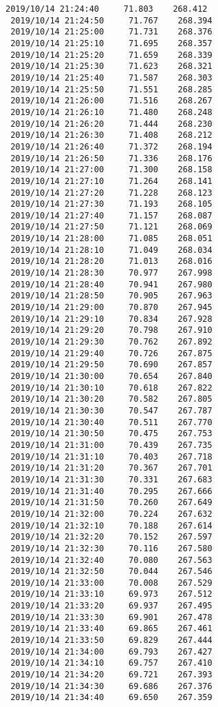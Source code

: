 \documentclass[11pt]{article}
\begin{document}
\begin{Verbatim}[commandchars=\\\{\}]
 2019/10/14 21:24:40     71.803    268.412
 2019/10/14 21:24:50     71.767    268.394
 2019/10/14 21:25:00     71.731    268.376
 2019/10/14 21:25:10     71.695    268.357
 2019/10/14 21:25:20     71.659    268.339
 2019/10/14 21:25:30     71.623    268.321
 2019/10/14 21:25:40     71.587    268.303
 2019/10/14 21:25:50     71.551    268.285
 2019/10/14 21:26:00     71.516    268.267
 2019/10/14 21:26:10     71.480    268.248
 2019/10/14 21:26:20     71.444    268.230
 2019/10/14 21:26:30     71.408    268.212
 2019/10/14 21:26:40     71.372    268.194
 2019/10/14 21:26:50     71.336    268.176
 2019/10/14 21:27:00     71.300    268.158
 2019/10/14 21:27:10     71.264    268.141
 2019/10/14 21:27:20     71.228    268.123
 2019/10/14 21:27:30     71.193    268.105
 2019/10/14 21:27:40     71.157    268.087
 2019/10/14 21:27:50     71.121    268.069
 2019/10/14 21:28:00     71.085    268.051
 2019/10/14 21:28:10     71.049    268.034
 2019/10/14 21:28:20     71.013    268.016
 2019/10/14 21:28:30     70.977    267.998
 2019/10/14 21:28:40     70.941    267.980
 2019/10/14 21:28:50     70.905    267.963
 2019/10/14 21:29:00     70.870    267.945
 2019/10/14 21:29:10     70.834    267.928
 2019/10/14 21:29:20     70.798    267.910
 2019/10/14 21:29:30     70.762    267.892
 2019/10/14 21:29:40     70.726    267.875
 2019/10/14 21:29:50     70.690    267.857
 2019/10/14 21:30:00     70.654    267.840
 2019/10/14 21:30:10     70.618    267.822
 2019/10/14 21:30:20     70.582    267.805
 2019/10/14 21:30:30     70.547    267.787
 2019/10/14 21:30:40     70.511    267.770
 2019/10/14 21:30:50     70.475    267.753
 2019/10/14 21:31:00     70.439    267.735
 2019/10/14 21:31:10     70.403    267.718
 2019/10/14 21:31:20     70.367    267.701
 2019/10/14 21:31:30     70.331    267.683
 2019/10/14 21:31:40     70.295    267.666
 2019/10/14 21:31:50     70.260    267.649
 2019/10/14 21:32:00     70.224    267.632
 2019/10/14 21:32:10     70.188    267.614
 2019/10/14 21:32:20     70.152    267.597
 2019/10/14 21:32:30     70.116    267.580
 2019/10/14 21:32:40     70.080    267.563
 2019/10/14 21:32:50     70.044    267.546
 2019/10/14 21:33:00     70.008    267.529
 2019/10/14 21:33:10     69.973    267.512
 2019/10/14 21:33:20     69.937    267.495
 2019/10/14 21:33:30     69.901    267.478
 2019/10/14 21:33:40     69.865    267.461
 2019/10/14 21:33:50     69.829    267.444
 2019/10/14 21:34:00     69.793    267.427
 2019/10/14 21:34:10     69.757    267.410
 2019/10/14 21:34:20     69.721    267.393
 2019/10/14 21:34:30     69.686    267.376
 2019/10/14 21:34:40     69.650    267.359

\end{Verbatim}
\end{document}

